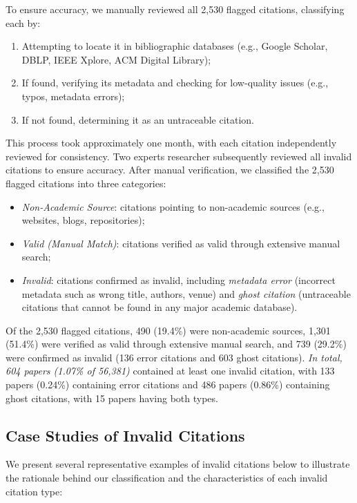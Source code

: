 To ensure accuracy, we manually reviewed all 2,530 flagged citations, classifying each by:
\begin{enumerate}
    \item Attempting to locate it in bibliographic databases (e.g., Google Scholar, DBLP, IEEE Xplore, ACM Digital Library);
    \item If found, verifying its metadata and checking for low-quality issues (e.g., typos, metadata errors);
    \item If not found, determining it as an untraceable citation.
\end{enumerate}
This process took approximately one month, with each citation independently reviewed for consistency. Two experts researcher subsequently reviewed all invalid citations to ensure accuracy.
After manual verification, we classified the 2,530 flagged citations into three categories:
\begin{itemize}
    \item \textit{Non-Academic Source}: citations pointing to non-academic sources (e.g., websites, blogs, repositories);
    \item \textit{Valid (Manual Match)}: citations verified as valid through extensive manual search;
    \item \textit{Invalid}: citations confirmed as invalid, including \textit{metadata error} (incorrect metadata such as wrong title, authors, venue) and \textit{ghost citation} (untraceable citations that cannot be found in any major academic database).
\end{itemize}
Of the 2,530 flagged citations, 490 (19.4\%) were non-academic sources, 1,301 (51.4\%) were verified as valid through extensive manual search, and 739 (29.2\%) were confirmed as invalid (136 error citations and 603 ghost citations).
\textit{In total, 604 papers (1.07\% of 56,381)} contained at least one invalid citation, with 133 papers (0.24\%) containing error citations and 486 papers (0.86\%) containing ghost citations, with 15 papers having both types. 

\subsection{Case Studies of Invalid Citations}
We present several representative examples of invalid citations below to illustrate the rationale behind our classification and the characteristics of each invalid citation type:



